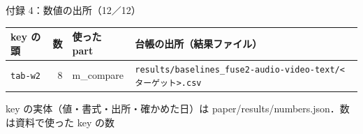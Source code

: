 \begin{frame}{付録 4：数値の出所（12／12）}
  \vspace{-0.3em}\centering\tiny\renewcommand{\arraystretch}{1.0}
  \begin{tabularx}{\textwidth}{@{}l r l X@{}}
    \toprule key の頭 & 数 & 使った part & 台帳の出所（結果ファイル） \\ \midrule
    \texttt{tab-w2} & 8 & m\_compare & \texttt{results/\allowbreak{}baselines\_\allowbreak{}fuse2-audio-video-text/\allowbreak{}<ターゲット>.csv} \\
    \bottomrule
  \end{tabularx}\par
  {\raggedright\tiny key の実体（値・書式・出所・確かめた日）は paper/results/numbers.json．数は資料で使った key の数\par}
\end{frame}
